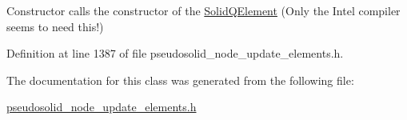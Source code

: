 Constructor calls the constructor of the \hyperlink{classoomph_1_1SolidQElement}{Solid\+Q\+Element} (Only the Intel compiler seems to need this!) 



Definition at line 1387 of file pseudosolid\+\_\+node\+\_\+update\+\_\+elements.\+h.



The documentation for this class was generated from the following file\+:\begin{DoxyCompactItemize}
\item 
\hyperlink{pseudosolid__node__update__elements_8h}{pseudosolid\+\_\+node\+\_\+update\+\_\+elements.\+h}\end{DoxyCompactItemize}
